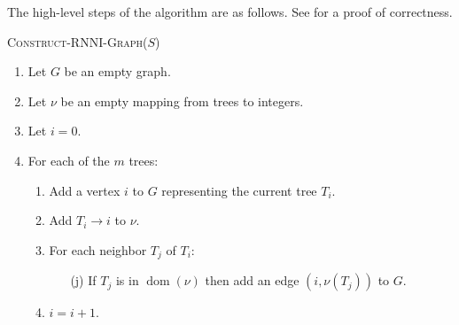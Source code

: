 \documentclass[11pt]{amsart}
\theoremstyle{definition}
\newcommand{\rnni}{\mathrm{RNNI}}
\newcommand{\dom}{\operatorname{dom}}
\begin{document}
The high-level steps of the algorithm are as follows.
See \cite{Whidden2015-es} for a proof of correctness.

\textsc{Construct-$\rnni$-Graph($S$)}
\begin{enumerate}[1.]
	\item Let $G$ be an empty graph.
	\item Let $\nu$ be an empty mapping from trees to integers.
	\item Let $i = 0$.
	\item For each of the $m$ trees: \vspace{-0.2em}
		\begin{enumerate}
			\item Add a vertex $i$ to $G$ representing the current tree $T_i$.
			\item Add $T_i \rightarrow i$ to $\nu$.
			\item For each neighbor $T_j$ of $T_i$:
				\begin{enumerate}
					\item[(j)] If $T_j$ is in $\dom(\nu)$ then add an edge $(i, \nu(T_j))$ to $G$.
				\end{enumerate}
		\item $i = i + 1$.
		\end{enumerate}
\end{enumerate}

\iftoggle{curvatureON}{
\section{Some other spaces}

Several important proposal mechanisms used in phylogenetic Bayesian inference by popular software packages such as BEAST2 \autocite{beast2} favor topological moves or tree moves depending on various conditions.
All tree moves we have been considering so far do not make an explicit distinction between topological changes and branch length changes.
To address this issue\todo{issue?}, we consider the following tree move that explicitly allows distributing the acceptance probability between topological and branch length moves.

{\bf Lazy walk.}
Let $p$ be the laziness probability, that is, we do nothing with probability $1-p$ and distribute the probability $p$ as follows.
We decide first on what type of move we want to perform: choose a topological move with probability $q$ and a length move otherwise, that is, $q \leq p$ and the probability of a length move is $p-q$.
The proposal is rejected if a topological move is impossible.

{\bf tau move.}
Choose a coordinate uniformly at random.
Increase the coordinate by $1$ with probability $p$ and decrease it by $1$ otherwise.
If the coordinate becomes $0$, resolve the multifurcation uniformly at random and set the new coordinate to $1$.
Note that this mechanism does not bound edge lengths from above and favors topological moves when $p<1/2$.
}{}
\end{document}
